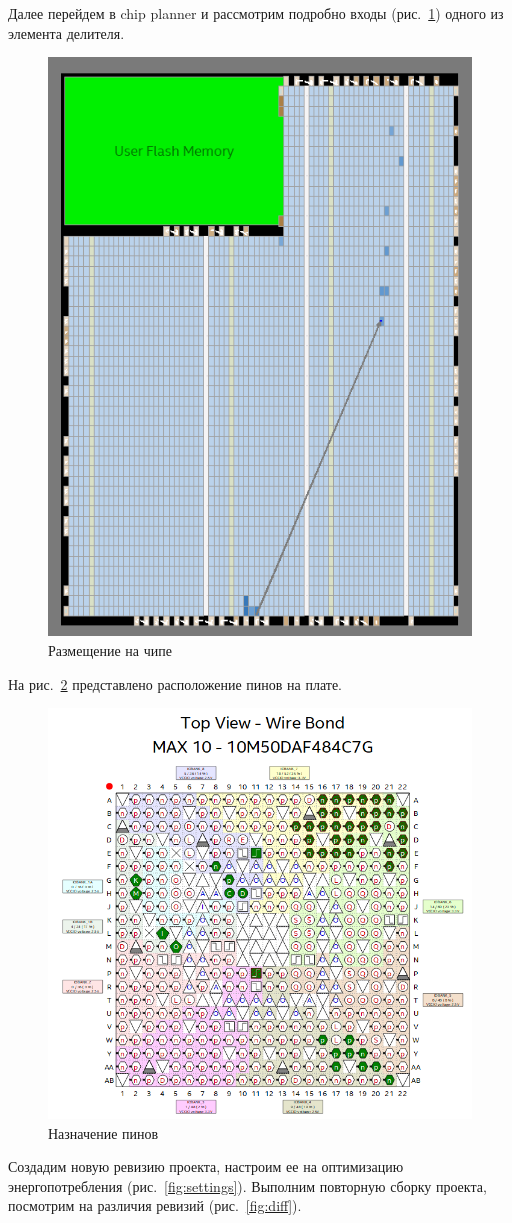 \documentclass[a4paper,14pt]{article}
\begin{document}
Далее перейдем в chip planner и рассмотрим подробно входы (рис.~\ref{fig:chip}) одного из элемента делителя.

\begin{figure}[H]
	\centering
	\includegraphics[width=0.5\linewidth]{image/chip}
	\caption{Размещение на чипе}
	\label{fig:chip}
\end{figure}

На рис.~\ref{fig:pins} представлено расположение пинов на плате.

\begin{figure}[H]
	\centering
	\includegraphics[width=0.8\linewidth]{image/pins}
	\caption{Назначение пинов}
	\label{fig:pins}
\end{figure}

Создадим новую ревизию проекта, настроим ее на оптимизацию энергопотребления (рис.~\ref{fig:settings}).
Выполним повторную сборку проекта, посмотрим на различия ревизий (рис.~\ref{fig:diff}).
\end{document}
